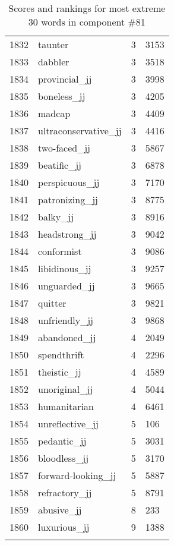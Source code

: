 \begin{longtable}[!htbp]{| rlr@{.}l |}
    1832 & taunter & 3 & 3153 \\
    1833 & dabbler & 3 & 3518 \\
    1834 & provincial\_jj & 3 & 3998 \\
    1835 & boneless\_jj & 3 & 4205 \\
    1836 & madcap & 3 & 4409 \\
    1837 & ultraconservative\_jj & 3 & 4416 \\
    1838 & two-faced\_jj & 3 & 5867 \\
    1839 & beatific\_jj & 3 & 6878 \\
    1840 & perspicuous\_jj & 3 & 7170 \\
    1841 & patronizing\_jj & 3 & 8775 \\
    1842 & balky\_jj & 3 & 8916 \\
    1843 & headstrong\_jj & 3 & 9042 \\
    1844 & conformist & 3 & 9086 \\
    1845 & libidinous\_jj & 3 & 9257 \\
    1846 & unguarded\_jj & 3 & 9665 \\
    1847 & quitter & 3 & 9821 \\
    1848 & unfriendly\_jj & 3 & 9868 \\
    1849 & abandoned\_jj & 4 & 2049 \\
    1850 & spendthrift & 4 & 2296 \\
    1851 & theistic\_jj & 4 & 4589 \\
    1852 & unoriginal\_jj & 4 & 5044 \\
    1853 & humanitarian & 4 & 6461 \\
    1854 & unreflective\_jj & 5 & 106 \\
    1855 & pedantic\_jj & 5 & 3031 \\
    1856 & bloodless\_jj & 5 & 3170 \\
    1857 & forward-looking\_jj & 5 & 5887 \\
    1858 & refractory\_jj & 5 & 8791 \\
    1859 & abusive\_jj & 8 & 233 \\
    1860 & luxurious\_jj & 9 & 1388 \\
    \hline
    \caption{Scores and rankings for most extreme 30 words in component \#81} \\
\end{longtable}
